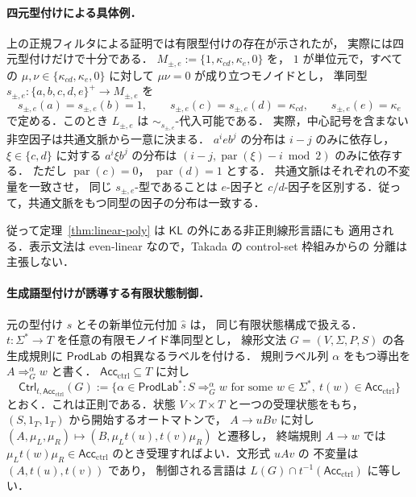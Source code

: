 \documentclass[11pt,a4paper]{ltjsarticle}
\theoremstyle{remark}
\theoremstyle{plain}
\begin{document}
\paragraph{四元型付けによる具体例．}
上の正規フィルタによる証明では有限型付けの存在が示されたが，
実際には四元型付けだけで十分である．
$M_{\pm,e}:=\{1,\kappa_{cd},\kappa_e,0\}$ を，
$1$ が単位元で，すべての
$\mu,\nu\in\{\kappa_{cd},\kappa_e,0\}$ に対して
$\mu\nu=0$ が成り立つモノイドとし，
準同型 $s_{\pm,e}:\{a,b,c,d,e\}^+\to M_{\pm,e}$ を
\begin{equation}\label{eq:lpm-s}
 s_{\pm,e}(a)=s_{\pm,e}(b)=1,\qquad
 s_{\pm,e}(c)=s_{\pm,e}(d)=\kappa_{cd},\qquad
 s_{\pm,e}(e)=\kappa_e
\end{equation}
で定める．このとき $L_{\pm,e}$ は
$\sim_{s_{\pm,e}}$-代入可能である．
実際，中心記号を含まない非空因子は共通文脈から一意に決まる．
$a^ieb^j$ の分布は $i-j$ のみに依存し，
$\xi\in\{c,d\}$ に対する $a^i\xi b^j$ の分布は
$(i-j,\operatorname{par}(\xi)-i\bmod2)$ のみに依存する．
ただし $\operatorname{par}(c)=0$，
$\operatorname{par}(d)=1$ とする．
共通文脈はそれぞれの不変量を一致させ，
同じ $s_{\pm,e}$-型であることは $e$-因子と
$c/d$-因子を区別する．従って，共通文脈をもつ同型の因子の分布は一致する．

従って定理~\ref{thm:linear-poly} は $\mathsf{KL}$ の外にある非正則線形言語にも
適用される．表示文法は even-linear なので，Takada の control-set 枠組みからの
分離は主張しない．

\paragraph{生成語型付けが誘導する有限状態制御．}
元の型付け $s$ とその新単位元付加 $\widehat s$ は，
同じ有限状態構成で扱える．
$t:\Sigma^*\to T$ を任意の有限モノイド準同型とし，
線形文法 $G=(V,\Sigma,P,S)$ の各生成規則に
$\mathsf{ProdLab}$ の相異なるラベルを付ける．
規則ラベル列 $\alpha$ をもつ導出を
$A\Rightarrow_G^\alpha w$ と書く．
$\mathsf{Acc}_{\mathrm{ctrl}}\subseteq T$ に対し
\[
\mathsf{Ctrl}_{t,\mathsf{Acc}_{\mathrm{ctrl}}}(G):=
\{\alpha\in\mathsf{ProdLab}^*:S\Rightarrow_G^\alpha w
\text{ for some }w\in\Sigma^*,\
t(w)\in\mathsf{Acc}_{\mathrm{ctrl}}\}
\]
とおく．これは正則である．状態
$V\times T\times T$ と一つの受理状態をもち，
$(S,1_T,1_T)$ から開始するオートマトンで，
$A\to uBv$ に対し
$(A,\mu_L,\mu_R)\mapsto
(B,\mu_Lt(u),t(v)\mu_R)$ と遷移し，
終端規則 $A\to w$ では
$\mu_Lt(w)\mu_R\in\mathsf{Acc}_{\mathrm{ctrl}}$
のとき受理すればよい．文形式 $uAv$ の
不変量は $(A,t(u),t(v))$ であり，
制御される言語は
$L(G)\cap t^{-1}(\mathsf{Acc}_{\mathrm{ctrl}})$ に等しい．
\end{document}
